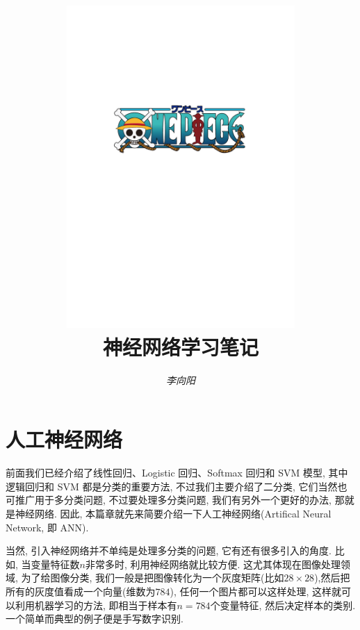 \documentclass[a4paper,UTF8]{ctexart}
\theoremstyle{plain} \newtheorem{theorem}{定理}[section]
\theoremstyle{plain} \newtheorem{definition}{定义}[section]
\theoremstyle{plain} \newtheorem{lemma}{引理}[section]
\theoremstyle{plain} \newtheorem{proposition}{命题}[section]
\theoremstyle{plain} \newtheorem{example}{例}[section]
\theoremstyle{plain} \newtheorem{remark}{注}[section]
\theoremstyle{plain} \newtheorem{corollary}{推论}[section]
\begin{document}
\title{
\includegraphics[width=0.65\textwidth]{onepiece.pdf}\\
\vspace{2em}
\textbf{神经网络学习笔记}}
\author{\emph{李向阳} 
}
\date{}

\maketitle
\thispagestyle{empty}

\newpage


\tableofcontents

\newpage

\section{人工神经网络}
前面我们已经介绍了线性回归、Logistic 回归、Softmax 回归和 SVM 模型, 其中逻辑回归和 SVM 都是分类的重要方法, 不过我们主要介绍了二分类, 它们当然也可推广用于多分类问题, 不过要处理多分类问题, 我们有另外一个更好的办法, 那就是神经网络. 因此, 本篇章就先来简要介绍一下人工神经网络(Artifical Neural Network, 即 ANN).

当然, 引入神经网络并不单纯是处理多分类的问题, 它有还有很多引入的角度. 比如, 当变量特征数$n$非常多时, 利用神经网络就比较方便. 这尤其体现在图像处理领域, 为了给图像分类, 我们一般是把图像转化为一个灰度矩阵(比如$28 \times 28$),然后把所有的灰度值看成一个向量(维数为$784$), 任何一个图片都可以这样处理,  这样就可以利用机器学习的方法, 即相当于样本有$n = 784$个变量特征, 然后决定样本的类别. 一个简单而典型的例子便是手写数字识别.
\end{document}
